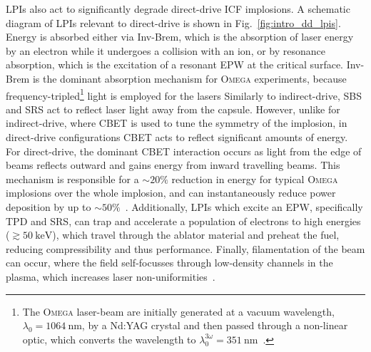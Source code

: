 \ac{LPIs} also act to significantly degrade direct-drive \ac{ICF} implosions.
A schematic diagram of \ac{LPIs} relevant to direct-drive is shown in Fig.~\ref{fig:intro_dd_lpis}.
Energy is absorbed either via \ac{Inv-Brem}, which is the absorption of laser energy by an electron while it undergoes a collision with an ion, or by resonance absorption, which is the excitation of a resonant \ac{EPW} at the critical surface.
\ac{Inv-Brem} is the dominant absorption mechanism for \textsc{Omega} experiments, because frequency-tripled\footnote{The \textsc{Omega} laser-beam are initially generated at a vacuum wavelength, $\lambda_0 = 1064\ \text{nm}$, by a Nd:YAG crystal and then passed through a non-linear optic, which converts the wavelength to $\lambda_0^{3\omega}=351\ \text{nm}$~\cite{boehly_upgrade_1995}.} light is employed for the lasers 
Similarly to indirect-drive, \ac{SBS} and \ac{SRS} act to reflect laser light away from the capsule.
However, unlike for indirect-drive, where \ac{CBET} is used to tune the symmetry of the implosion, in direct-drive configurations \ac{CBET} acts to reflect significant amounts of energy.
For direct-drive, the dominant \ac{CBET} interaction occurs as light from the edge of beams reflects outward and gains energy from inward travelling beams.
This mechanism is responsible for a $\sim20\%$ reduction in energy for typical \textsc{Omega} implosions over the whole implosion, and can instantaneously reduce power deposition by up to $\sim50\%$~\cite{colaitis_inverse_2021}.
Additionally, \ac{LPIs} which excite an \ac{EPW}, specifically \ac{TPD} and \ac{SRS}, can trap and accelerate a population of electrons to high energies ($\gtrsim50\ \text{keV}$), which travel through the ablator material and preheat the fuel, reducing compressibility and thus performance.
Finally, filamentation of the beam can occur, where the field self-focusses through low-density channels in the plasma, which increases laser non-uniformities~\cite{afshar-rad_evidence_1992}.

